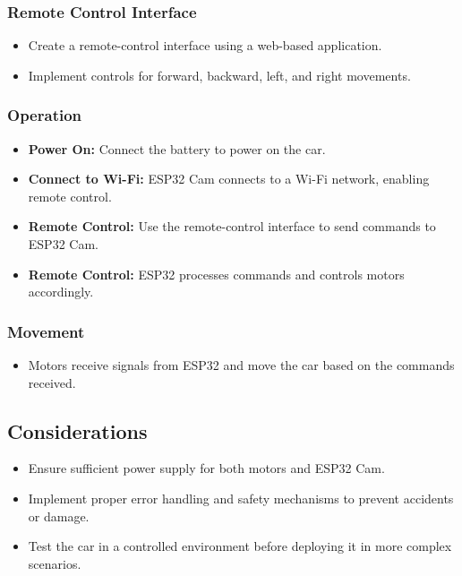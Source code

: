 \documentclass[conference]{IEEEtran}
\begin{document}
\subsubsection{\textbf{Remote Control Interface}}
\begin{itemize}
 \item Create a remote-control interface using a web-based application.
    \item Implement controls for forward, backward, left, and right movements.
\end{itemize}

\subsubsection{\textbf{Operation}}
\begin{itemize}

    \item \textbf{Power On:} Connect the battery to power on the car.

       \item \textbf{Connect to Wi-Fi:} ESP32 Cam connects to a Wi-Fi network, enabling remote control.


    \item \textbf{Remote Control:} Use the remote-control interface to send commands to ESP32 Cam.
    \item \textbf{Remote Control:} ESP32 processes commands and controls motors accordingly.
\end{itemize}

\subsubsection {\textbf{Movement}}
\begin{itemize}
    \item Motors receive signals from ESP32 and move the car based on the commands received.
\end{itemize}

\subsection{\textbf{Considerations}}
\begin{itemize}
    \item Ensure sufficient power supply for both motors and ESP32 Cam.
     \item Implement proper error handling and safety mechanisms to prevent accidents or damage.
 \item Test the car in a controlled environment before deploying it in more complex scenarios.
\end{itemize}
\end{document}
